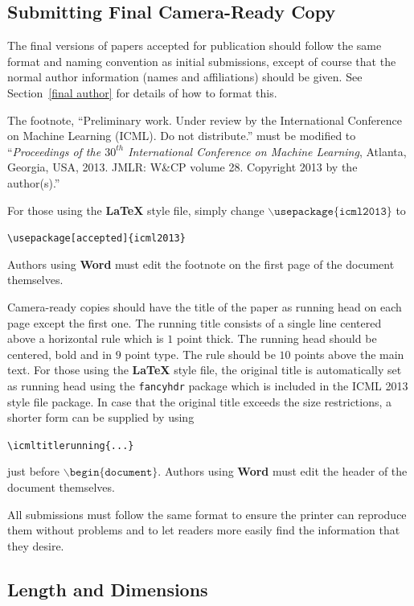 \documentclass{article}
\begin{document}
\subsection{Submitting Final Camera-Ready Copy}

The final versions of papers accepted for publication should follow the
same format and naming convention as initial submissions, except of
course that the normal author information (names and affiliations)
should be given.  See Section~\ref{final author} for details of how to
format this.

The footnote, ``Preliminary work.  Under review by the International
Conference on Machine Learning (ICML).  Do not distribute.'' must be
modified to ``\textit{Proceedings of the
$\mathit{30}^{th}$ International Conference on Machine Learning},
Atlanta, Georgia, USA, 2013.  JMLR: W\&CP volume 28. 
Copyright 2013 by the author(s).''

For those using the \textbf{\LaTeX} style file, simply change
$\mathtt{\backslash usepackage\{icml2013\}}$ to 

\verb|\usepackage[accepted]{icml2013}|

\noindent
Authors using \textbf{Word} must edit the
footnote on the first page of the document themselves.

Camera-ready copies should have the title of the paper as running head
on each page except the first one.  The running title consists of a
single line centered above a horizontal rule which is $1$ point thick.
The running head should be centered, bold and in $9$ point type.  The
rule should be $10$ points above the main text.  For those using the
\textbf{\LaTeX} style file, the original title is automatically set as running
head using the {\tt fancyhdr} package which is included in the ICML
2013 style file package.  In case that the original title exceeds the
size restrictions, a shorter form can be supplied by using

\verb|\icmltitlerunning{...}|

just before $\mathtt{\backslash begin\{document\}}$.
Authors using \textbf{Word} must edit the header of the document themselves.
 
All submissions must follow the same format to ensure the printer can
reproduce them without problems and to let readers more easily find
the information that they desire.

\subsection{Length and Dimensions}
\end{document}
